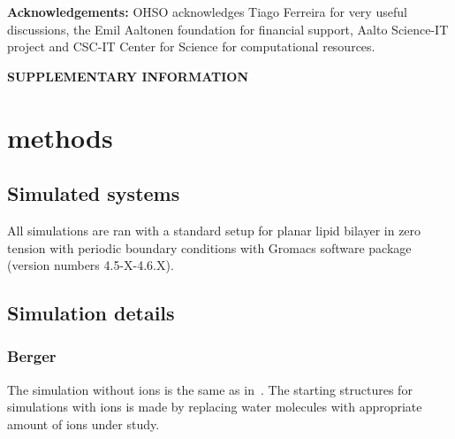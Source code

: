 \documentclass[pre,aps,floatfix,authordate1-4,twocolumn]{revtex4-1}
\begin{document}
{\bf Acknowledgements: }
OHSO acknowledges Tiago Ferreira for very useful discussions, the Emil Aaltonen foundation for financial support, Aalto Science-IT project and CSC-IT Center for Science for computational resources. 





\newpage

\appendix
\begin{center}
{\bf SUPPLEMENTARY INFORMATION}
\end{center}

\section{methods}

\subsection{Simulated systems}
All simulations are ran with a standard setup for planar lipid bilayer in zero tension
with periodic boundary conditions with Gromacs software package (version numbers 4.5-X-4.6.X).





\subsection{Simulation details}
\subsubsection{Berger}
The simulation without ions is the same as in~\cite{botan15}. The starting structures for simulations with ions is
made by replacing water molecules with appropriate amount of ions under study.
\end{document}
